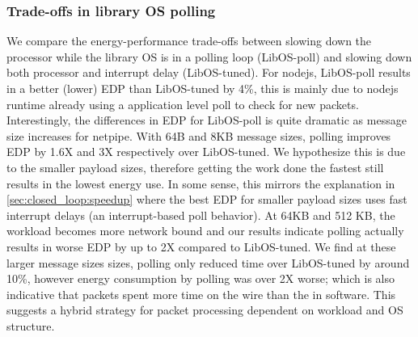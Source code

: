 \subsubsection{Trade-offs in library OS polling}
\label{sec:closed_loop:poll}
We compare the energy-performance trade-offs between slowing down the processor while the library OS is in a polling loop (LibOS-poll) and slowing down both processor and interrupt delay (LibOS-tuned). For nodejs, LibOS-poll results in a better (lower) EDP than LibOS-tuned by 4\%, this is mainly due to nodejs runtime already using a application level poll to check for new packets. Interestingly, the differences in EDP for LibOS-poll is quite dramatic as message size increases for netpipe. With 64B and 8KB message sizes, polling improves EDP by 1.6X and 3X respectively over LibOS-tuned. We hypothesize this is due to the smaller payload sizes, therefore getting the work done the fastest still results in the lowest energy use. In some sense, this mirrors the explanation in \cref{sec:closed_loop:speedup} where the best EDP for smaller payload sizes uses fast interrupt delays (an interrupt-based poll behavior). At 64KB and 512 KB, the workload becomes more network bound and our results indicate polling actually results in worse EDP by up to 2X compared to LibOS-tuned. We find at these larger message sizes sizes, polling only reduced time over LibOS-tuned by around 10\%, however energy consumption by polling was over 2X worse; which is also indicative that packets spent more time on the wire than the in software. This suggests a hybrid strategy for packet processing dependent on workload and OS structure.

